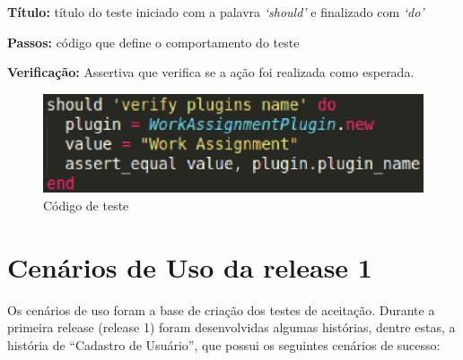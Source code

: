 \textbf{Título:} título do teste iniciado com a palavra \textit{‘should’} e finalizado com \textit{‘do’}

\textbf{Passos:} código que define o comportamento do teste

\textbf{Verificação:} Assertiva que verifica se a ação foi realizada como esperada.

\begin{figure}[!h]
    \centering
    \includegraphics[keepaspectratio=true,scale=0.55]
      {figuras/teste_should.eps}
    \caption{Código de teste}
    \label{noosfero_should}
\end{figure}

\section{Cenários de Uso da release 1}
\label{cenario_uso}
    Os cenários de uso foram a base de criação dos testes de aceitação.
    Durante a primeira release (release 1) foram desenvolvidas algumas histórias, dentre estas, a história de ``Cadastro de Usuário'', que possui os seguintes cenários de sucesso:

